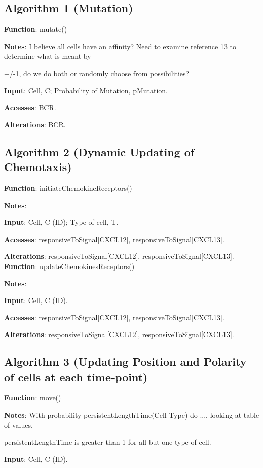 \documentclass[english]{article}
\begin{document}
\subsection{Algorithm 1 (Mutation)}	

\textbf{Function}: mutate() 

\textbf{Notes}: I believe all cells have an affinity? Need to examine reference 13 to determine what is meant by 

+/-1, do we do both or randomly choose from possibilities? 


\textbf{Input}: Cell, C; Probability of Mutation, pMutation.

\textbf{Accesses}: BCR.

\textbf{Alterations}: BCR.


\subsection{Algorithm 2 (Dynamic Updating of Chemotaxis)}
\textbf{Function}: initiateChemokineReceptors() 

\textbf{Notes}: 

\textbf{Input}: Cell, C (ID); Type of cell, T.

\textbf{Accesses}: responsiveToSignal[CXCL12], responsiveToSignal[CXCL13].

\textbf{Alterations}: responsiveToSignal[CXCL12], responsiveToSignal[CXCL13].
\\

\textbf{Function}: updateChemokinesReceptors()

\textbf{Notes}: 
 
\textbf{Input}: Cell, C (ID).

\textbf{Accesses}: responsiveToSignal[CXCL12], responsiveToSignal[CXCL13].

\textbf{Alterations}: responsiveToSignal[CXCL12], responsiveToSignal[CXCL13].

\subsection{Algorithm 3 (Updating Position and Polarity of cells at each time-point)}

\textbf{Function}: move()
 
\textbf{Notes}: With probability persistentLengthTime(Cell Type) do ..., looking at table of values, 

persistentLengthTime is greater than 1 for all but one type of cell. 

\textbf{Input}: Cell, C (ID).	
\end{document}

